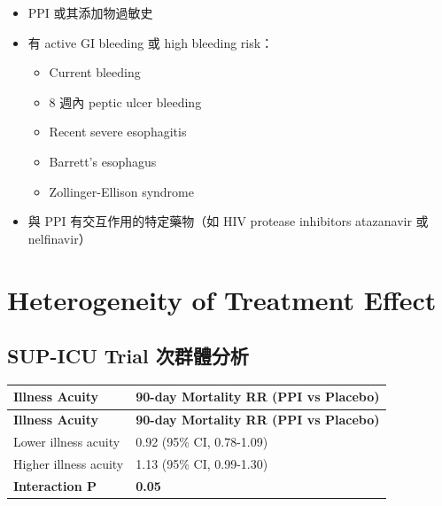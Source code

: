 \documentclass[12pt,a4paper]{article}
\begin{document}
\begin{itemize}
    \item PPI 或其添加物過敏史
    \item 有 active GI bleeding 或 high bleeding risk：
    \begin{itemize}
        \item Current bleeding
        \item 8 週內 peptic ulcer bleeding
        \item Recent severe esophagitis
        \item Barrett's esophagus
        \item Zollinger-Ellison syndrome
    \end{itemize}
    \item 與 PPI 有交互作用的特定藥物（如 HIV protease inhibitors atazanavir 或 nelfinavir）
\end{itemize}

\section{Heterogeneity of Treatment Effect}


\subsection{SUP-ICU Trial 次群體分析}

\begin{longtable}{p{5cm}p{9cm}}
\toprule
\textbf{Illness Acuity} & \textbf{90-day Mortality RR (PPI vs Placebo)} \\
\midrule
\endfirsthead

\toprule
\textbf{Illness Acuity} & \textbf{90-day Mortality RR (PPI vs Placebo)} \\
\midrule
\endhead

\bottomrule
\endfoot

Lower illness acuity & 0.92 (95\% CI, 0.78-1.09) \\
\midrule
Higher illness acuity & 1.13 (95\% CI, 0.99-1.30) \\
\midrule
\textbf{Interaction P} & \textbf{0.05} \\
\bottomrule
\end{longtable}
\end{document}
